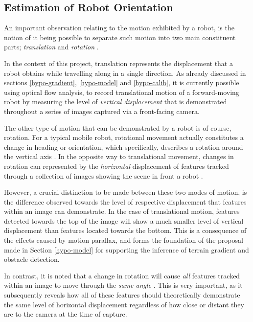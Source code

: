 \subsection{Estimation of Robot Orientation}

An important observation relating to the motion exhibited by a robot, is the notion of it being possible to separate such motion into two main constituent parts; \textit{translation} and \textit{rotation} \cite{campbell}. 

In the context of this project, translation represents the displacement that a robot obtains while travelling along in a single direction. As already discussed in sections \ref{hypo-gradient}, \ref{hypo-model} and \ref{hypo-calib}, it is currently possible using optical flow analysis, to record translational motion of a forward-moving robot by measuring the level of \textit{vertical displacement} that is demonstrated throughout a series of images captured via a front-facing camera.

The other type of motion that can be demonstrated by a robot is of course, rotation. For a typical mobile robot, rotational movement actually constitutes a change in heading or orientation, which specifically, describes a rotation around the vertical axis \cite{campbell}. In the opposite way to translational movement, changes in rotation can represented by the \textit{horizontal} displacement of features tracked through a collection of images showing the scene in front a robot \cite{labrosse}. 

However, a crucial distinction to be made between these two modes of motion, is the difference observed towards the level of respective displacement that features within an image can demonstrate. In the case of translational motion, features detected towards the top of the image will show a much smaller level of vertical displacement than features located towards the bottom. This is a consequence of the effects caused by motion-parallax, and forms the foundation of the proposal made in Section \ref{hypo-model} for supporting the inference of terrain gradient and obstacle detection. 

In contrast, it is noted that a change in rotation will cause \textit{all} features tracked within an image to move through the \textit{same angle} \cite{campbell}. This is very important, as it subsequently reveals how all of these features should theoretically demonstrate the same level of horizontal displacement regardless of how close or distant they are to the camera at the time of capture.


